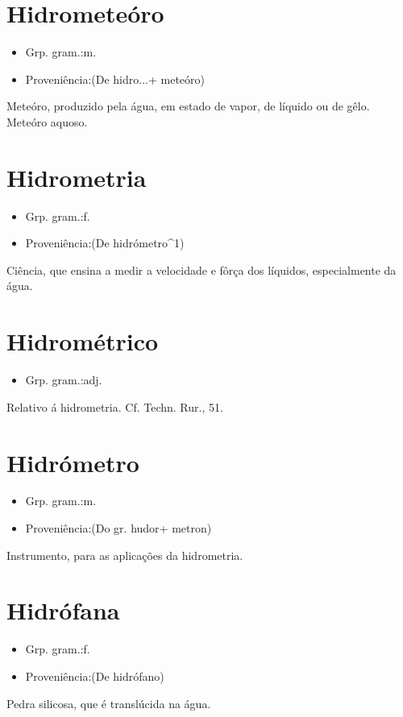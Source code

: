 \documentclass{article}
\begin{document}
\section{Hidrometeóro}
\begin{itemize}
\item {Grp. gram.:m.}
\end{itemize}
\begin{itemize}
\item {Proveniência:(De \textunderscore hidro...\textunderscore  + \textunderscore meteóro\textunderscore )}
\end{itemize}
Meteóro, produzido pela água, em estado de vapor, de líquido ou de gêlo.
Meteóro aquoso.
\section{Hidrometria}
\begin{itemize}
\item {Grp. gram.:f.}
\end{itemize}
\begin{itemize}
\item {Proveniência:(De \textunderscore hidrómetro\textunderscore ^1)}
\end{itemize}
Ciência, que ensina a medir a velocidade e fôrça dos líquidos, especialmente da água.
\section{Hidrométrico}
\begin{itemize}
\item {Grp. gram.:adj.}
\end{itemize}
Relativo á hidrometria. Cf. \textunderscore Techn. Rur.\textunderscore , 51.
\section{Hidrómetro}
\begin{itemize}
\item {Grp. gram.:m.}
\end{itemize}
\begin{itemize}
\item {Proveniência:(Do gr. \textunderscore hudor\textunderscore  + \textunderscore metron\textunderscore )}
\end{itemize}
Instrumento, para as aplicações da hidrometria.
\section{Hidrófana}
\begin{itemize}
\item {Grp. gram.:f.}
\end{itemize}
\begin{itemize}
\item {Proveniência:(De \textunderscore hidrófano\textunderscore )}
\end{itemize}
Pedra silicosa, que é translúcida na água.
\end{document}
